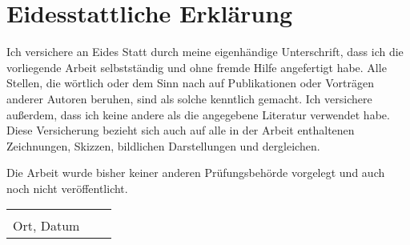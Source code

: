 %
%
%

\section*{Eidesstattliche Erklärung}%
Ich versichere an Eides Statt durch meine eigenhändige Unterschrift, dass ich die vorliegende Arbeit selbstständig und ohne fremde Hilfe angefertigt habe. Alle Stellen, die wörtlich oder dem Sinn nach auf Publikationen oder Vorträgen anderer Autoren beruhen, sind als solche kenntlich gemacht. Ich versichere außerdem, dass ich keine andere als die angegebene Literatur verwendet habe. Diese Versicherung bezieht sich auch auf alle in der Arbeit enthaltenen Zeichnungen, Skizzen, bildlichen Darstellungen und dergleichen.

\vspace{1em}
Die Arbeit wurde bisher keiner anderen Prüfungsbehörde vorgelegt und auch noch nicht veröffentlicht.
\vspace{3cm}

\begin{center}
\begin{tabular}{>{\centering\arraybackslash}p{55mm}p{10mm} >{\centering\arraybackslash}p{55mm}}
	\hrulefill&&\hrulefill \\
	\small Ort, Datum&&\small \AuthorName
\end{tabular}
\end{center}